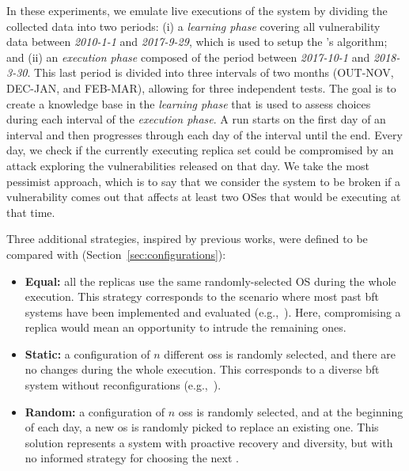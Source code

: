 In these experiments, we emulate live executions of the system by dividing the collected data into two periods:
(i) a \emph{learning phase} covering all vulnerability data between \emph{2010-1-1} and \emph{2017-9-29}, which is used to setup the \risk's algorithm; and (ii) an \emph{execution phase} composed of the period between \emph{2017-10-1} and \emph{2018-3-30}.
This last period is divided into three intervals of two months (OUT-NOV, DEC-JAN, and FEB-MAR), allowing for three independent tests.
The goal is to create a knowledge base in the \emph{learning phase} that is used to assess \system choices during each interval of the \emph{execution phase}. 
A run starts on the first day of an interval and then progresses through each day of the interval until the end. Every day, we check if the currently executing replica set could be compromised by an attack exploring the vulnerabilities released on that day. 
We take the most pessimist approach, which is to say that we consider the system to be broken if a vulnerability comes out that affects at least two OSes that would be executing at that time.

Three additional strategies, inspired by previous works, were defined to be compared with \system (Section~\ref{sec:configurations}):

\begin{itemize}
\item \textbf{Equal:} all the replicas use the same randomly-selected OS during the whole execution. 
This strategy corresponds to the scenario where most past \gls{bft} systems have been implemented and evaluated (e.g.,~\cite{Kotla:2010,Aublin:2015,Behl:2015,Veronese:2013,Behl:2017,Liu:2016,Yin:2003,Amir:2011,Bessani:2014,Clement:2009b}). 
Here, compromising a replica would mean an opportunity to intrude the remaining ones.

\item \textbf{Static:} a configuration of $n$ different \glspl{os} is randomly selected, and there are no changes during the whole execution. 
This corresponds to a diverse \gls{bft} system without reconfigurations (e.g.,~\cite{Rodrigues:2001}).

\item \textbf{Random:} a configuration of $n$ \glspl{os} is randomly selected, and at the beginning of each day, a new \gls{os} is randomly picked to replace an existing one. 
This solution represents a system with proactive recovery and diversity, but with no informed strategy for choosing the next \configuration.

\end{itemize}

